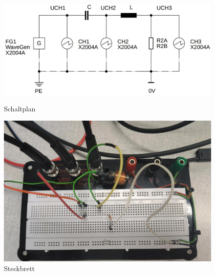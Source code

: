 \documentclass[12pt,a4paper,twoside]{article}
\begin{document}
\begin{figure}[H]
    \begin{minipage}[b]{.5\linewidth} %
        \includegraphics[width=1\linewidth]{nudes/Aufgabe 4 schaltplan.jpg}
        \caption{Schaltplan }
        \label{fig:a4s}
    \end{minipage}
    \hspace{0.01\linewidth}%
    \begin{minipage}[b]{.5\linewidth} %
        \includegraphics[width=1\linewidth]{nudes/a4 brett.jpg}
    \caption{Steckbrett}
    \label{fig:a4b}
    \end{minipage}
\end{figure}
\end{document}
